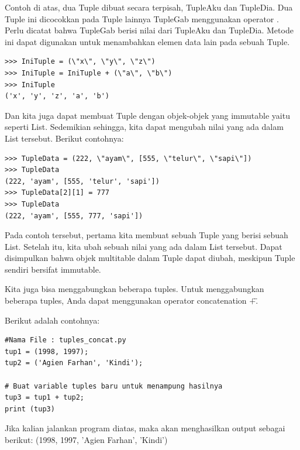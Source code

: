 Contoh di atas, dua Tuple dibuat secara terpisah, TupleAku dan TupleDia. Dua Tuple ini dicocokkan pada Tuple lainnya TupleGab menggunakan operator \+. Perlu dicatat bahwa TupleGab berisi nilai dari TupleAku dan TupleDia. Metode ini dapat digunakan untuk menambahkan elemen data lain pada sebuah Tuple. 
\begin{verbatim}
>>> IniTuple = (\"x\", \"y\", \"z\") 
>>> IniTuple = IniTuple + (\"a\", \"b\")
>>> IniTuple 
('x', 'y', 'z', 'a', 'b') 
\end{verbatim}
Dan kita juga dapat membuat Tuple dengan objek-objek yang immutable yaitu seperti List. Sedemikian sehingga, kita dapat mengubah nilai yang ada dalam List tersebut. Berikut contohnya: 
\begin{verbatim}
>>> TupleData = (222, \"ayam\", [555, \"telur\", \"sapi\"]) 
>>> TupleData 
(222, 'ayam', [555, 'telur', 'sapi']) 
>>> TupleData[2][1] = 777 
>>> TupleData 
(222, 'ayam', [555, 777, 'sapi']) 
\end{verbatim}
Pada contoh tersebut, pertama kita membuat sebuah Tuple yang berisi sebuah List. Setelah itu, kita ubah sebuah nilai yang ada dalam List tersebut. Dapat disimpulkan bahwa objek multitable dalam Tuple dapat diubah, meskipun Tuple sendiri bersifat immutable. 

Kita juga bisa menggabungkan beberapa tuples. Untuk menggabungkan beberapa tuples, Anda dapat menggunakan operator concatenation \"+\". 

Berikut adalah contohnya: 
\begin{verbatim}
#Nama File : tuples_concat.py 
tup1 = (1998, 1997); 
tup2 = ('Agien Farhan', 'Kindi'); 

# Buat variable tuples baru untuk menampung hasilnya 
tup3 = tup1 + tup2; 
print (tup3) 
\end{verbatim}
Jika kalian jalankan program diatas, maka akan menghasilkan output sebagai berikut: 
(1998, 1997, 'Agien Farhan', 'Kindi') 


